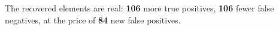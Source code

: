 \documentclass[final]{beamer}
\newlength{\colwidth}
\begin{document}
\begin{frame}[t]
\begin{columns}[t]
\begin{column}{\colwidth}

    The recovered elements are real: \textbf{106} more true positives,
    \textbf{106} fewer false negatives, at the price of \textbf{84} new
    false positives.


\end{column}
\end{columns}
\end{frame}
\end{document}
